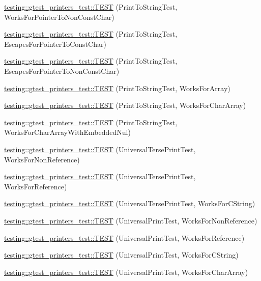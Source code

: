 \begin{DoxyCompactItemize}
\item 
\hyperlink{namespacetesting_1_1gtest__printers__test_a1db34d8760c17157572ce2877007d15a}{testing\+::gtest\+\_\+printers\+\_\+test\+::\+T\+E\+ST} (Print\+To\+String\+Test, Works\+For\+Pointer\+To\+Non\+Const\+Char)
\item 
\hyperlink{namespacetesting_1_1gtest__printers__test_ab8fce4287e837cfcd851ded56b62f9ce}{testing\+::gtest\+\_\+printers\+\_\+test\+::\+T\+E\+ST} (Print\+To\+String\+Test, Escapes\+For\+Pointer\+To\+Const\+Char)
\item 
\hyperlink{namespacetesting_1_1gtest__printers__test_a7203081ef422f0835643d2c54b8ebf28}{testing\+::gtest\+\_\+printers\+\_\+test\+::\+T\+E\+ST} (Print\+To\+String\+Test, Escapes\+For\+Pointer\+To\+Non\+Const\+Char)
\item 
\hyperlink{namespacetesting_1_1gtest__printers__test_a78bd89af8a8505880b78ec2a001d3cb8}{testing\+::gtest\+\_\+printers\+\_\+test\+::\+T\+E\+ST} (Print\+To\+String\+Test, Works\+For\+Array)
\item 
\hyperlink{namespacetesting_1_1gtest__printers__test_ad122dc21e7ebad023d7048ef117a1129}{testing\+::gtest\+\_\+printers\+\_\+test\+::\+T\+E\+ST} (Print\+To\+String\+Test, Works\+For\+Char\+Array)
\item 
\hyperlink{namespacetesting_1_1gtest__printers__test_a65e208358dddc7747f4519410c71d877}{testing\+::gtest\+\_\+printers\+\_\+test\+::\+T\+E\+ST} (Print\+To\+String\+Test, Works\+For\+Char\+Array\+With\+Embedded\+Nul)
\item 
\hyperlink{namespacetesting_1_1gtest__printers__test_ab49ff6527b0b01411b725fe46e1af65c}{testing\+::gtest\+\_\+printers\+\_\+test\+::\+T\+E\+ST} (Universal\+Terse\+Print\+Test, Works\+For\+Non\+Reference)
\item 
\hyperlink{namespacetesting_1_1gtest__printers__test_ab7adb58a0e08e0830157a5a1c7bceac5}{testing\+::gtest\+\_\+printers\+\_\+test\+::\+T\+E\+ST} (Universal\+Terse\+Print\+Test, Works\+For\+Reference)
\item 
\hyperlink{namespacetesting_1_1gtest__printers__test_ab11252e228a240a349d747546bc222d2}{testing\+::gtest\+\_\+printers\+\_\+test\+::\+T\+E\+ST} (Universal\+Terse\+Print\+Test, Works\+For\+C\+String)
\item 
\hyperlink{namespacetesting_1_1gtest__printers__test_a43d4efc91c2ea7d8220891df9b0437df}{testing\+::gtest\+\_\+printers\+\_\+test\+::\+T\+E\+ST} (Universal\+Print\+Test, Works\+For\+Non\+Reference)
\item 
\hyperlink{namespacetesting_1_1gtest__printers__test_a58ad7c81884e852b09646764ce14a47e}{testing\+::gtest\+\_\+printers\+\_\+test\+::\+T\+E\+ST} (Universal\+Print\+Test, Works\+For\+Reference)
\item 
\hyperlink{namespacetesting_1_1gtest__printers__test_ac20aca012aca1ca9589dbf7483fbbbd1}{testing\+::gtest\+\_\+printers\+\_\+test\+::\+T\+E\+ST} (Universal\+Print\+Test, Works\+For\+C\+String)
\item 
\hyperlink{namespacetesting_1_1gtest__printers__test_a23a9eda97679bfc29c87b8de17cc35bf}{testing\+::gtest\+\_\+printers\+\_\+test\+::\+T\+E\+ST} (Universal\+Print\+Test, Works\+For\+Char\+Array)
\end{DoxyCompactItemize}


